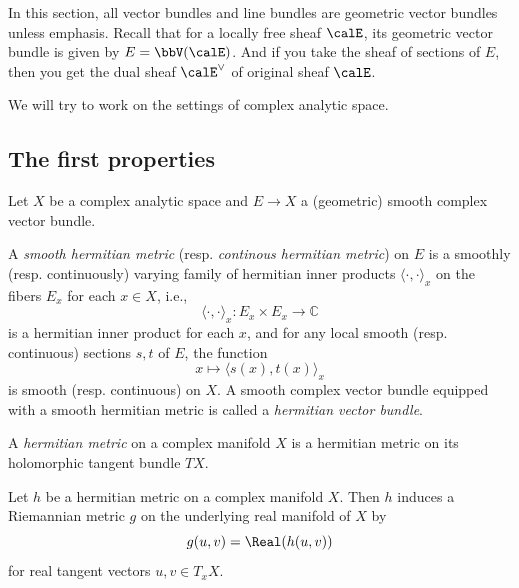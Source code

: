 

In this section, all vector bundles and line bundles are geometric vector bundles unless emphasis.
Recall that for a locally free sheaf $\calE$, its geometric vector bundle is given by $E = \bbV(\calE)$.
And if you take the sheaf of sections of $E$, then you get the dual sheaf $\calE^\vee$ of original sheaf $\calE$.

We will try to work on the settings of complex analytic space.

\subsection{The first properties}

Let \(X\) be a complex analytic space and \(E \to X\) a (geometric) smooth complex vector bundle.

\begin{definition}\label{def:hermitian-metric-on-holomorphic-vector-bundles}
	A \emph{smooth hermitian metric} (resp. \emph{continous hermitian metric}) on \(E\) is a smoothly (resp. continuously) varying family of hermitian inner products \(\langle \cdot, \cdot \rangle_x\) on the fibers \(E_x\) for each \(x \in X\),
	i.e.,
	\[\langle \cdot, \cdot \rangle_x: E_x \times E_x \to \mathbb{C}\]
	is a hermitian inner product for each \(x\), and for any local smooth (resp. continuous) sections \(s,t\) of \(E\), the function
	\[x \mapsto \langle s(x), t(x) \rangle_x\]
	is smooth (resp. continuous) on \(X\).
	A smooth complex vector bundle equipped with a smooth hermitian metric is called a \emph{hermitian vector bundle}.
\end{definition}

\begin{definition}\label{def:hermitian-metric-on-tangent-bundle}
	A \emph{hermitian metric} on a complex manifold \(X\) is a hermitian metric on its holomorphic tangent bundle \(TX\).
\end{definition}

\begin{remark}\label{rmk:Riemannian_metric_induced_by_hermitian_metric}
	Let \(h\) be a hermitian metric on a complex manifold \(X\).
	Then \(h\) induces a Riemannian metric \(g\) on the underlying real manifold of \(X\) by
	\[g(u,v) = \Real(h(u,v))\]
	for real tangent vectors \(u,v \in T_x X\).
\end{remark}

